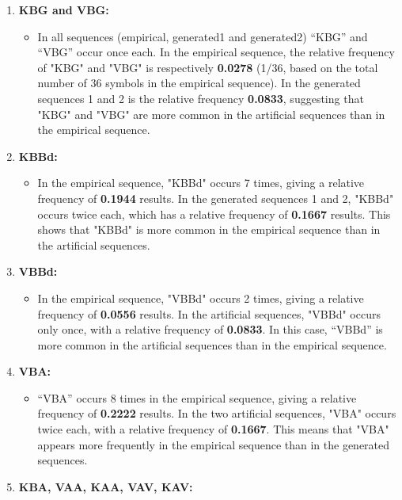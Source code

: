 \documentclass[
]{article}
\begin{document}
\begin{enumerate}
\def\labelenumi{\arabic{enumi}.}
\item
  \textbf{KBG and VBG:}

  \begin{itemize}
  \item
    In all sequences (empirical, generated1 and generated2) ``KBG'' and
    ``VBG'' occur once each. In the empirical sequence, the relative
    frequency of "KBG" and "VBG" is respectively \textbf{0.0278} (1/36,
    based on the total number of 36 symbols in the empirical sequence).
    In the generated sequences 1 and 2 is the relative frequency
    \textbf{0.0833}, suggesting that "KBG" and "VBG" are more common in
    the artificial sequences than in the empirical sequence.
  \end{itemize}
\item
  \textbf{KBBd:}

  \begin{itemize}
  \item
    In the empirical sequence, "KBBd" occurs 7 times, giving a relative
    frequency of \textbf{0.1944} results. In the generated sequences 1
    and 2, "KBBd" occurs twice each, which has a relative frequency of
    \textbf{0.1667} results. This shows that "KBBd" is more common in
    the empirical sequence than in the artificial sequences.
  \end{itemize}
\item
  \textbf{VBBd:}

  \begin{itemize}
  \item
    In the empirical sequence, "VBBd" occurs 2 times, giving a relative
    frequency of \textbf{0.0556} results. In the artificial sequences,
    "VBBd" occurs only once, with a relative frequency of
    \textbf{0.0833}. In this case, ``VBBd'' is more common in the
    artificial sequences than in the empirical sequence.
  \end{itemize}
\item
  \textbf{VBA:}

  \begin{itemize}
  \item
    ``VBA'' occurs 8 times in the empirical sequence, giving a relative
    frequency of \textbf{0.2222} results. In the two artificial
    sequences, "VBA" occurs twice each, with a relative frequency of
    \textbf{0.1667}. This means that "VBA" appears more frequently in
    the empirical sequence than in the generated sequences.
  \end{itemize}
\item
  \textbf{KBA, VAA, KAA, VAV, KAV:}


\end{enumerate}
\end{document}
